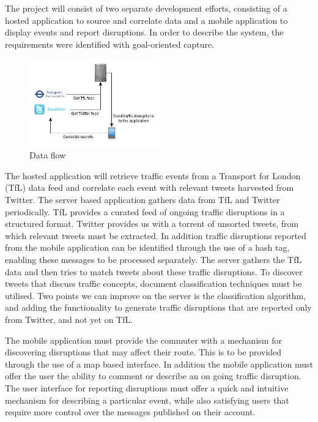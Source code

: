 The project will consist of two separate development efforts, consisting of a hosted application to source and correlate data and a mobile application to display events and report disruptions. In order to describe the system, the requirements were identified with goal-oriented capture\cite{Requirements}.

\begin{figure}[here]
\begin{center}
\includegraphics[width=0.5\textwidth]{images/draft_architecture.jpg}
\end{center}
\vspace{-20pt}
\caption{Data flow}
\end{figure}

The hosted application will retrieve traffic events from a Transport for London (TfL) data feed and correlate each event with relevant tweets harvested from Twitter. The server based application gathers data from TfL and Twitter periodically. TfL provides a curated feed of ongoing traffic disruptions in a structured format. Twitter provides us with a torrent of unsorted tweets, from which relevant tweets must be extracted. In addition traffic disruptions reported from the mobile application can be identified through the use of a hash tag, enabling these messages to be processed separately. The server gathers the TfL data and then tries to match tweets about these traffic disruptions. To discover tweets that discuss traffic concepts, document classification techniques must be utilised. Two points we can improve on the server is the classification algorithm, and adding the functionality to generate traffic disruptions that are reported only from Twitter, and not yet on TfL.

The mobile application must provide the commuter with a mechanism for discovering disruptions that may affect their route. This is to be provided through the use of a map based interface. In addition the mobile application must offer the user the ability to comment or describe an on going traffic disruption. The user interface for reporting disruptions must offer a quick and intuitive mechanism for describing a particular event, while also satisfying users that require more control over the messages published on their account.

